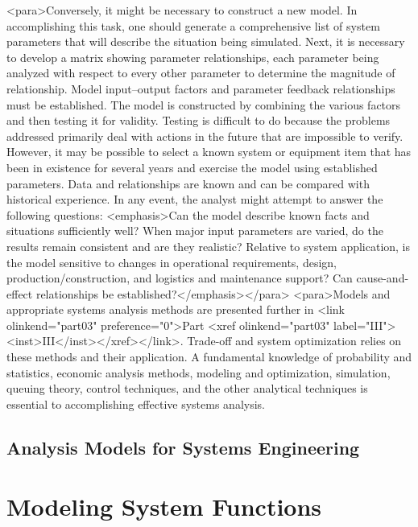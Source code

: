 <para>Conversely, it might be necessary to construct a new model. In accomplishing this task, one should generate a comprehensive list of system parameters that will describe the situation being simulated. Next, it is necessary to develop a matrix showing parameter relationships, each parameter being analyzed with respect to every other parameter to determine the magnitude of relationship. Model input–output factors and parameter feedback relationships must be established. The model is constructed by combining the various factors and then testing it for validity. Testing is difficult to do because the problems addressed primarily deal with actions in the future that are impossible to verify. However, it may be possible to select a known system or equipment item that has been in existence for several years and exercise the model using established parameters. Data and relationships are known and can be compared with historical experience. In any event, the analyst might attempt to answer the following questions: <emphasis>Can the model describe known facts and situations sufficiently well? When major input parameters are varied, do the results remain consistent and are they realistic? Relative to system application, is the model sensitive to changes in operational requirements, design, production/construction, and logistics and maintenance support? Can cause-and-effect relationships be established?</emphasis></para>
<para>Models and appropriate systems analysis methods are presented further in <link olinkend="part03" preference="0">Part <xref olinkend="part03" label="III"><inst>III</inst></xref></link>. Trade-off and system optimization relies on these methods and their application. A fundamental knowledge of probability and statistics, economic analysis methods, modeling and optimization, simulation, queuing theory, control techniques, and the other analytical techniques is essential to accomplishing effective systems analysis.

\subsection{Analysis Models for Systems Engineering}


\section{Modeling System Functions}

